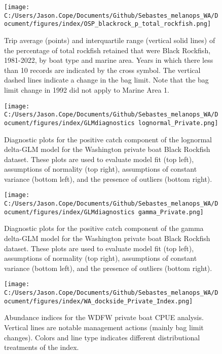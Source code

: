 \documentclass[11pt,
  letterpaper,
]{article}
\begin{document}
\pagebreak

\begin{figure}
{\centering
\texttt{[image: C:/Users/Jason.Cope/Documents/Github/Sebastes\_melanops\_WA/Document/figures/index/OSP\_blackrock\_p\_total\_rockfish.png]}
}
\caption{Trip average (points) and interquartile range (vertical solid lines) of the percentage of total rockfish retained that were Black Rockfish, 1981-2022, by boat type and marine area. Years in which there less than 10 records are indicated by the cross symbol. The vertical dashed lines indicate a change in the bag limit. Note that the bag limit change in 1992 did not apply to Marine Area 1.\label{fig:blackrock_percentage}}
\end{figure}

\pagebreak

\begin{figure}
{\centering
\texttt{[image: C:/Users/Jason.Cope/Documents/Github/Sebastes\_melanops\_WA/Document/figures/index/GLMdiagnostics lognormal\_Private.png]}
}
\caption{Diagnostic plots for the positive catch component of the lognormal delta-GLM model for the Washington private boat Black Rockfish dataset.  These plots are used to evaluate model fit (top left), assumptions of normality (top right), assumptions of constant variance (bottom left), and the presence of outliers (bottom right).\label{fig:private-log-diags}}
\end{figure}

\pagebreak

\begin{figure}
{\centering
\texttt{[image: C:/Users/Jason.Cope/Documents/Github/Sebastes\_melanops\_WA/Document/figures/index/GLMdiagnostics gamma\_Private.png]}
}
\caption{Diagnostic plots for the positive catch component of the gamma delta-GLM model for the Washington private boat Black Rockfish dataset.  These plots are used to evaluate model fit (top left), assumptions of normality (top right), assumptions of constant variance (bottom left), and the presence of outliers (bottom right).\label{fig:private-gam-diags}}
\end{figure}

\pagebreak

\begin{figure}
{\centering
\texttt{[image: C:/Users/Jason.Cope/Documents/Github/Sebastes\_melanops\_WA/Document/figures/index/WA\_dockside\_Private\_Index.png]}
}
\caption{Abundance indices for the WDFW private boat CPUE analysis. Vertical lines are notable management actions (mainly bag limit changes). Colors and line type indicates different distributional treatments of the index.\label{fig:private-index}}
\end{figure}
\end{document}
